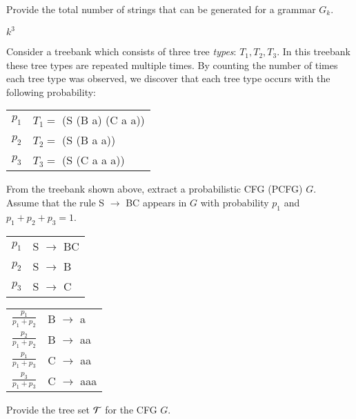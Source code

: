 \documentclass[12pt]{article}
\begin{document}
\begin{exe}
\begin{xlist}
{\ex Provide the total number of strings that can be generated for a grammar $G_k$.
\begin{soln}
$k^3$
\end{soln}
}

\end{xlist}

\bigskip
\ex\label{pcfgtree} Consider a treebank which consists of three tree {\em types}: $T_1, T_2, T_3$. In this treebank these tree types are repeated multiple times. By counting the number of times each tree type was observed, we discover that each tree type occurs with the following probability:

\begin{center}
\begin{tabular}{ll}
$p_1$ & $T_1 = $ (S (B a) (C a a)) \\
$p_2$ & $T_2 = $ (S (B a a)) \\
$p_3$ & $T_3 = $ (S (C a a a)) 
\end{tabular}
\end{center}

\begin{xlist}
\smallskip
\ex From the treebank shown above, extract a probabilistic CFG (PCFG) $G$. \\
Assume that the rule S $\rightarrow$ BC appears in $G$ with probability $p_1$ and $p_1 + p_2 + p_3 = 1$.

\begin{soln}
\begin{minipage}[t]{2.5in}
 \begin{tabular}{ll}
 $p_1$ & S $\rightarrow$ BC \\
 $p_2$ & S $\rightarrow$ B \\
 $p_3$ & S $\rightarrow$ C 
 \end{tabular}
\end{minipage}
\begin{minipage}[t]{2.5in}
 \begin{tabular}{ll}
 $\frac{p_1}{p_1 + p_2}$ & B $\rightarrow$ a \\
 $\frac{p_2}{p_1 + p_2}$ & B $\rightarrow$ aa \\
 $\frac{p_1}{p_1 + p_3}$ & C $\rightarrow$ aa \\
 $\frac{p_3}{p_1 + p_3}$ & C $\rightarrow$ aaa
 \end{tabular}
\end{minipage}
\end{soln}

\smallskip
\ex Provide the tree set ${\cal T}$ for the CFG $G$.


\end{xlist}
\end{exe}
\end{document}
